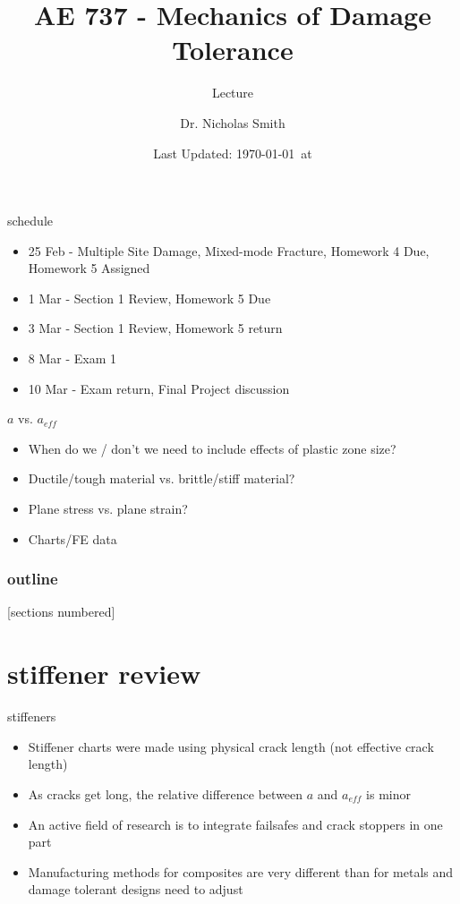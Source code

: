 \documentclass[10pt]{beamer}
\title{AE 737 - Mechanics of Damage Tolerance}
\subtitle{Lecture \arabic{lecture}}
\date{Last Updated: \today\ at \DTMcurrenttime}
\author{Dr. Nicholas Smith}
\institute{Wichita State University, Department of Aerospace Engineering}
\begin{document}
\maketitle
\begin{frame}{schedule}
	\begin{itemize}
		\item 25 Feb - Multiple Site Damage, Mixed-mode Fracture, Homework 4 Due, Homework 5 Assigned
		\item 1 Mar - Section 1 Review, Homework 5 Due
		\item 3 Mar - Section 1 Review, Homework 5 return
		\item 8 Mar - Exam 1
		\item 10 Mar - Exam return, Final Project discussion
	\end{itemize}
\end{frame}

\begin{frame}{$a$ vs. $a_{eff}$}
	\begin{itemize}[<+->]
		\item When do we / don't we need to include effects of plastic zone size?
		\item Ductile/tough material vs. brittle/stiff material?
		\item Plane stress vs. plane strain?
		\item Charts/FE data
	\end{itemize}
\end{frame}

\begin{frame}
  \frametitle{outline}
  [sections numbered]
  \tableofcontents[hideallsubsections]
\end{frame}

\section{stiffener review}

\begin{frame}{stiffeners}
	\begin{itemize}[<+->]
		\item Stiffener charts were made using physical crack length (not effective crack length)
		\item As cracks get long, the relative difference between $a$ and $a_{eff}$ is minor
		\item An active field of research is to integrate failsafes and crack stoppers in one part
		\item Manufacturing methods for composites are very different than for metals and damage tolerant designs need to adjust
	\end{itemize}
\end{frame}
\end{document}
